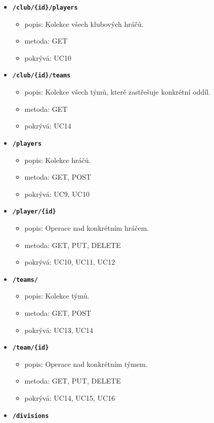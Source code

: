\begin{itemize}
  \item \texttt{\textbf{/club/\{id\}/players}}
  \begin{itemize}
    \item popis: Kolekce všech klubových hráčů.
    \item metoda: GET
    \item pokrývá: UC10
  \end{itemize}
  \item \texttt{\textbf{/club/\{id\}/teams}}
  \begin{itemize}
    \item popis: Kolekce všech týmů, které zastřešuje konkrétní oddíl.
    \item metoda: GET
    \item pokrývá: UC14
  \end{itemize}
  \item \texttt{\textbf{/players}}
  \begin{itemize}
    \item popis: Kolekce hráčů.
    \item metoda: GET, POST
    \item pokrývá: UC9, UC10
  \end{itemize}
  \item \texttt{\textbf{/player/\{id\}}}
  \begin{itemize}
    \item popis: Operace nad konkrétním hráčem.
    \item metoda: GET, PUT, DELETE
    \item pokrývá: UC10, UC11, UC12
  \end{itemize}
  \item \texttt{\textbf{/teams/}}
  \begin{itemize}
    \item popis: Kolekce týmů.
    \item metoda: GET, POST
    \item pokrývá: UC13, UC14
  \end{itemize}
  \item \texttt{\textbf{/team/\{id\}}}
  \begin{itemize}
    \item popis: Operace nad konkrétním týmem.
    \item metoda: GET, PUT, DELETE
    \item pokrývá: UC14, UC15, UC16
  \end{itemize}
  \item \texttt{\textbf{/divisions}}
  \begin{itemize}

\end{itemize}
\end{itemize}

